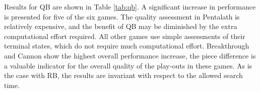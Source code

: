 \documentclass{ecai2014}
\begin{document}
Results for QB are shown in Table \ref{tab:qb}. A significant increase in performance is presented for five of the six games. The quality assessment in Pentalath is relatively expensive, and the benefit of QB may be diminished by the extra computational effort required. All other games use simple assessments of their terminal states, which do not require much computational effort. Breakthrough and Cannon show the highest overall performance increase, the piece difference is a valuable indicator for the overall quality of the play-outs in these games. As is the case with RB, the results are invariant with respect to the allowed search time.

\begin{table}
{\caption{Qualitative Bonus and Relative Bonus combined using different search times, 5000 games. Reward = terminal quality, 500 games} \label{tab:qbrb}}
\tabcolsep=0.15cm
\centering
{}
\vspace{2mm}
\end{table}
\end{document}
